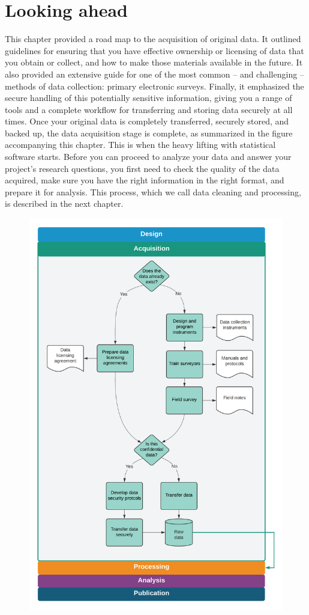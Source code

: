 \section{Looking ahead}

This chapter provided a road map to the acquisition of original data.
It outlined guidelines for ensuring that you have effective ownership
or licensing of data that you obtain or collect,
and how to make those materials available in the future.
It also provided an extensive guide for one of the most common --
and challenging --
methods of data collection: primary electronic surveys.
Finally, it emphasized the secure handling of this potentially sensitive information,
giving you a range of tools and a complete workflow
for transferring and storing data securely at all times.
Once your original data is completely transferred, securely stored, and backed up,
the data acquisition stage is complete, as
summarized in the figure accompanying this chapter.
This is when the heavy lifting with statistical software starts.
Before you can proceed to analyze your data
and answer your project's research questions,
you first need to check the quality of the data acquired,
make sure you have the right information in the right format, and prepare it for analysis.
This process, which we call data cleaning and processing,
is described in the next chapter.

\begin{fullwidth}
	\begin{figure}
		\centering
		\includegraphics[width=1.5\linewidth]{diagrams/Acquisition}
	\end{figure}
\end{fullwidth}
